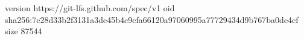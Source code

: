 version https://git-lfs.github.com/spec/v1
oid sha256:7c28d33b2f3131a3de45b4c9cfa66120a97060995a77729434d9b767ba0de4cf
size 87544
